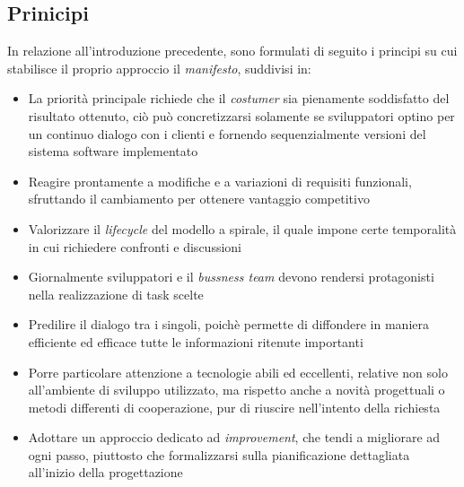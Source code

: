 \documentclass{article}
\begin{document}
\subsection*{Prinicipi}
\large
In relazione all'introduzione precedente, sono formulati di seguito i principi su cui stabilisce il proprio approccio il \textit{manifesto}, suddivisi in:
\begin{itemize}[label={-}]
    \itemsep0em
    \item La priorità principale richiede che il \textit{costumer} sia pienamente soddisfatto del risultato ottenuto, ciò può concretizzarsi solamente se sviluppatori optino per un continuo dialogo con i clienti e fornendo sequenzialmente versioni del sistema software implementato
    \item Reagire prontamente a modifiche e a variazioni di requisiti funzionali, sfruttando il cambiamento per ottenere vantaggio competitivo
    \item Valorizzare il \textit{lifecycle} del modello a spirale, il quale impone certe temporalità in cui richiedere confronti e discussioni
    \item Giornalmente sviluppatori e il \textit{bussness team} devono rendersi protagonisti nella realizzazione di task scelte
    \item Predilire il dialogo tra i singoli, poichè permette di diffondere in maniera efficiente ed efficace tutte le informazioni ritenute importanti
    \item Porre particolare attenzione a tecnologie abili ed eccellenti, relative non solo all'ambiente di sviluppo utilizzato, ma rispetto anche a novità progettuali o metodi differenti di cooperazione, pur di riuscire nell'intento della richiesta
    \item Adottare un approccio dedicato ad \textit{improvement}, che tendi a migliorare ad ogni passo, piuttosto che formalizzarsi sulla pianificazione dettagliata all'inizio della progettazione
\end{itemize}
\end{document}
